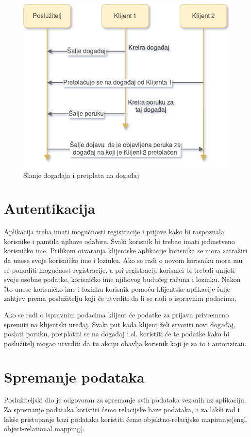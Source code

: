 \documentclass[times, utf8, zavrsni]{fer}
\begin{document}
\begin{figure}[htb]
\centering
\includegraphics[width=14cm]{img/event-subscription.png}
\caption{Slanje događaja i pretplata na događaj}
\label{fig:event-subscription-image}
\end{figure}

\section{Autentikacija}
Aplikacija treba imati mogućnosti registracije i prijave kako bi raspoznala korisnike i pamtila njihove odabire. Svaki korisnik bi trebao imati jedinstveno korisničko ime. Prilikom otvaranja klijentske aplikacije korisnika se mora zatražiti da unese svoje korisničko ime i lozinku. Ako se radi o novom korisniku mora mu se ponuditi mogućnost registracije, a pri registraciji korisnici bi trebali unijeti svoje osobne podatke, korisničko ime njihovog budućeg računa i lozinku. Nakon što unese korisničko ime i lozinku korisnik pomoću klijentske aplikacije šalje zahtjev prema poslužitelju koji će utvrditi da li se radi o ispravnim podacima. 

Ako se radi o ispravnim podacima klijent će podatke za prijavu privremeno spremiti na klijentski uređaj. Svaki put kada klijent želi stvoriti novi događaj, poslati poruku, pretplatiti se na događaj i sl. koristiti će te podatke kako bi poslužitelj mogao utvrditi da tu akciju obavlja korisnik koji je za to i autoriziran.

\section{Spremanje podataka}
Poslužiteljski dio je odgovoran za spremanje svih podataka vezanih uz aplikaciju. Za spremanje podataka koristiti ćemo relacijske baze podataka, a za lakši rad i lakše pristupanje bazi podataka koristiti ćemo objektno-relacijsko mapiranje(engl. object-relational mapping).
\end{document}
